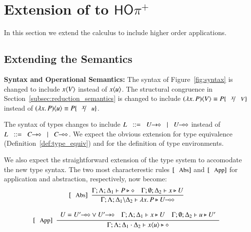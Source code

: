 \newcommand{\HOpp}{\ensuremath{\mathsf{HO\pi^{+}}}\xspace}
\section{Extension of \HOp to \HOpp}

In this section we extend the \HOp calculus to include higher order applications.

\subsection{Extending the Semantics}

{\bf Syntax and Operational Semantics:}
The syntax of Figure~\ref{fig:syntax} is changed to include $x\langle V \rangle$
instead of $x\langle u \rangle$.
The structural congruence in Section~\ref{subsec:reduction_semantics}
is changed to include $\appl{(\abs{x} P)}{V} \scong P \subst{x}{V}$
instead of $\appl{(\abs{x} P)}{u} \scong P \subst{x}{u}$.

The syntax of types changes to include $L \bnfis \shot{U} \bnfbar \lhot{U}$
instead of $L \bnfis \shot{C} \bnfbar \lhot{C}$. We expect the obvious
extension for type equivalence (Definition~\ref{def:type_equiv})
and for the definition of type environments.

We also expect the straightforward extension of the type 
system to accomodate the new type syntax. The two
most characterestic rules $\trule{Abs}$ and $\trule{App}$ 
for application and abstraction, respectively, now become:
\[
	\begin{array}{c}
		\trule{Abs}~~\tree{
			\Gamma; \Lambda; \Delta_1 \proves P \hastype \Proc
			\quad
			\Gamma; \es; \Delta_2 \proves x \hastype U
		}{
			\Gamma; \Lambda; \Delta_1 \backslash \Delta_2 \proves \abs{x}{P} \hastype \lhot{U}
		}
		\\[6mm]

		\trule{App}~~\tree{
			\begin{array}{c}
				U = \lhot{U'} \lor \shot{U'}
				\quad
				\Gamma; \Lambda; \Delta_1 \proves x \hastype U
				\quad
				\Gamma; \es; \Delta_2 \proves u \hastype U'
			\end{array}
		}{
			\Gamma; \Lambda; \Delta_1 \cat \Delta_2 \proves \appl{x}{u} \hastype \Proc
		} 
	\end{array}
\]


